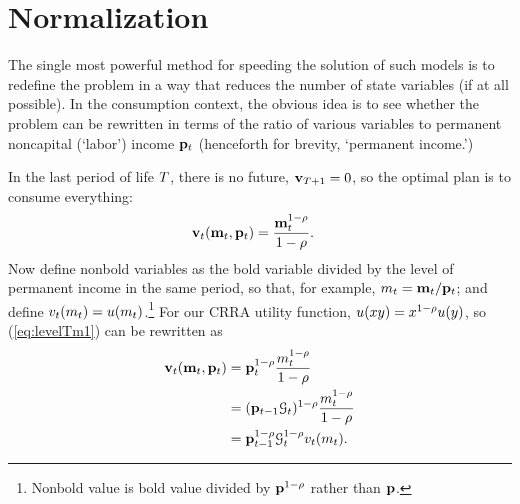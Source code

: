 \hypertarget{normalization}{}
\section{Normalization}\label{sec:normalization}

The single most powerful method for speeding the solution of such models is to redefine the problem in a way that reduces the number of state variables (if at all possible).  In the consumption context, the obvious idea is to see whether the problem can be rewritten in terms of the ratio of various variables to permanent noncapital (`labor') income $\mathbf{p}_{t}$ (henceforth for brevity, `permanent income.')

In the last {period} of life $T$, there is no future, ${\mathbf{v}}_{T+1} = 0$, so the optimal plan is to consume everything:
\begin{equation}\begin{gathered}\begin{aligned}
      {\mathbf{v}}_{t}(\mathbf{m}_{t},\mathbf{p}_{t})  & = \frac{\mathbf{m}_{t}^{1-\rho}}{1-\rho}. \label{eq:levelTm1}
    \end{aligned}\end{gathered}\end{equation}
Now define nonbold variables as the bold variable divided by the level of permanent income in the same period, so that, for example, ${m}_{t}=\mathbf{m}_{t}/\mathbf{p}_{t}$; and define $v_{t}({m}_{t}) = u({m}_{t})$.\footnote{Nonbold value is bold value divided by $\mathbf{p}^{1-\rho}$ rather than $\mathbf{p}$.}  For our CRRA utility function, $u(xy)=x^{1-\rho}u(y)$, so (\ref{eq:levelTm1}) can be rewritten as
\begin{equation}\begin{gathered}\begin{aligned}
      {\mathbf{v}}_{t}(\mathbf{m}_{t},\mathbf{p}_{t}) & = \mathbf{p}_{t}^{1-\rho}\frac{{m}_{t}^{1-\rho}}{1-\rho}                       \\
                                                & = (\mathbf{p}_{t-1}\mathcal{G}_{t})^{1-\rho}\frac{{m}_{t}^{1-\rho}}{1-\rho} \\
                                                &= \mathbf{p}_{t-1}^{1-\rho}\mathcal{G}_{t}^{1-\rho}v_{t}({m}_{t}). \label{eq:vT}
    \end{aligned}\end{gathered}\end{equation}

